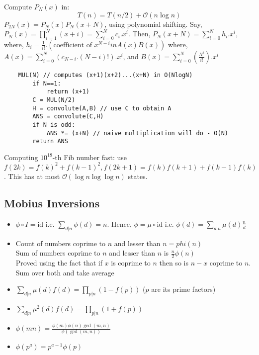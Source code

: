 Compute $P_N(x)$ in:
\begin{equation}
  T(n)=T(n/2)+\mathcal{O}(n\log n)
\end{equation}
$P_{2N}(x) = P_{N}(x)P_{N}(x+N)$, using polynomial shifting.
Say, $P_N(x) = \prod \limits_{i=1}^N (x+i) = \sum_{i=0}^N c_i.x^i$.
Then, $P_N(x+N) = \sum_{i=0}^N h_i.x^i$, where, $h_i = \frac{1}{i!} . (\text{coefficient of } x^{N-i} in A(x)B(x))$ where, $A(x) = \sum \limits_{i=0}^{N} (c_{N-i}.(N-i)!) . x^i$, and $B(x) = \sum \limits_{i=0}^{N} \left( \frac {N^i}{i!} \right) . x^i$

\begin{verbatim}
    MUL(N) // computes (x+1)(x+2)...(x+N) in O(NlogN)
        if N==1:
            return (x+1)
        C = MUL(N/2)
        H = convolute(A,B) // use C to obtain A
        ANS = convolute(C,H)
        if N is odd:
            ANS *= (x+N) // naive multiplication will do - O(N)
        return ANS
\end{verbatim}

Computing $10^{18}$-th Fib number fast: use $f(2k) = f(k)^2 + f(k - 1)^2, f(2k + 1) = f(k)f(k + 1) + f(k - 1)f(k)$. This has at most $\mathcal{O}(\log n\log\log n)$ states.


\subsection{Mobius Inversions}

\begin{itemize}
  \item $\phi \circ I = \text{id}$ i.e. $\sum_{d|n} \phi(d)=n$. Hence, $\phi = \mu \circ \text{id}$ i.e. $\phi(d)=\sum_{d|n} \mu(d) \frac{n}{d}$
  \item Count of numbers coprime to $n$ and lesser than $n = phi(n)$ \\
        Sum of numbers coprime to $n$ and lesser than $n$  is $\frac{n}{2}\phi(n)$ \\
        Proved using the fact that if $x$ is coprime to $n$ then so is $n-x$ coprime to $n$. Sum over both and take average
  \item $\sum_{d|n} \mu(d)f(d)=\prod_{p|n} (1 - f(p))$ ($p$ are its prime factors)
  \item $\sum_{d|n} \mu^2(d)f(d)=\prod_{p|n} (1 + f(p))$
  \item $\phi(mn) = \frac{\phi(m)\phi(n)\gcd(m,n)}{\phi(\gcd(m,n))}$
  \item $\phi(p^a) = p^{a-1}\phi{(p)}$
\end{itemize}
